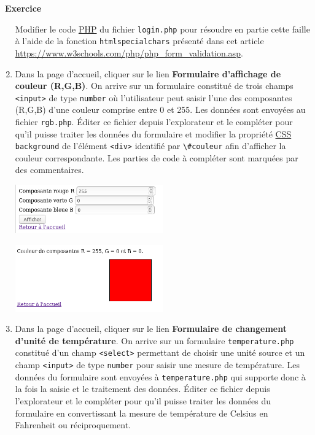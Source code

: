 \documentclass[
  11pt,
]{article}
\newcommand{\passthrough}[1]{#1}
\newcounter{exo}
\newenvironment{exercice}[1]
{\par \medskip   \addtocounter{exo}{1} \noindent  
\begin{bclogo}[arrondi =0.1,   noborder = true, logo=\bccrayon, marge=4]{~\textbf{Exercice} \textbf{\theexo} {\itshape #1} }  \par}
{
\end{bclogo}
 \par \bigskip }
\newcounter{prop}
\newcounter{logi}
\begin{document}
\begin{exercice}{}
\begin{enumerate}
  Modifier le code
  \href{https://developer.mozilla.org/fr/docs/Glossaire/PHP}{PHP} du
  fichier \passthrough{\lstinline!login.php!} pour résoudre en partie
  cette faille à l'aide de la fonction
  \passthrough{\lstinline!htmlspecialchars!} présenté dans cet article
  \url{https://www.w3schools.com/php/php_form_validation.asp}.
\item
  Dans la page d'accueil, cliquer sur le lien \textbf{Formulaire
  d'affichage de couleur (R,G,B)}. On arrive sur un formulaire constitué
  de trois champs \passthrough{\lstinline!<input>!} de type
  \passthrough{\lstinline!number!} où l'utilisateur peut saisir l'une
  des composantes (R,G,B) d'une couleur comprise entre 0 et 255. Les
  données sont envoyées au fichier \passthrough{\lstinline!rgb.php!}.
  Éditer ce fichier depuis l'explorateur et le compléter pour qu'il
  puisse traiter les données du formulaire et modifier la propriété
  \href{https://developer.mozilla.org/fr/docs/Glossaire/CSS}{CSS}
  \passthrough{\lstinline!background!} de l'élément
  \passthrough{\lstinline!<div>!} identifié par
  \passthrough{\lstinline!\#couleur!} afin d'afficher la couleur
  correspondante. Les parties de code à compléter sont marquées par des
  commentaires.

  \includegraphics[width=0.5\textwidth,height=\textheight]{images/formulaire_rgb.png}~

  \includegraphics[width=0.5\textwidth,height=\textheight]{images/couleur_rgb.png}~
\item
  Dans la page d'accueil, cliquer sur le lien \textbf{Formulaire de
  changement d'unité de température}. On arrive sur un formulaire
  \passthrough{\lstinline!temperature.php!} constitué d'un champ
  \passthrough{\lstinline!<select>!} permettant de choisir une unité
  source et un champ \passthrough{\lstinline!<input>!} de type
  \passthrough{\lstinline!number!} pour saisir une mesure de
  température. Les données du formulaire sont envoyées à
  \passthrough{\lstinline!temperature.php!} qui supporte donc à la fois
  la saisie et le traitement des données. Éditer ce fichier depuis
  l'explorateur et le compléter pour qu'il puisse traiter les données du
  formulaire en convertissant la mesure de température de Celsius en
  Fahrenheit ou réciproquement.


\end{enumerate}
\end{exercice}
\end{document}
